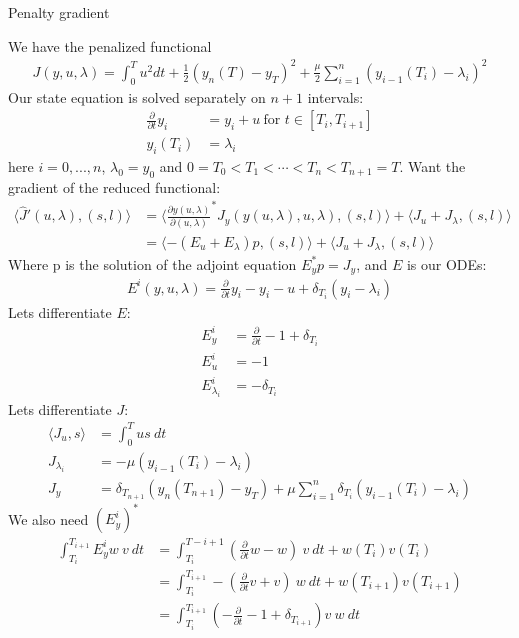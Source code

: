 \documentclass[11pt,a4paper]{report}
\begin{document}
\begin{center}

\LARGE Penalty gradient


\end{center}
We have the penalized functional
\begin{align*}
J(y,u,\lambda) = \int_0^T u^2 dt + \frac{1}{2}(y_n(T)-y_T)^2 + \frac{\mu}{2} \sum_{i=1}^n (y_{i-1}(T_i)-\lambda_i)^2 
\end{align*}
Our state equation is solved separately on $n+1$ intervals:
\begin{align*}
\frac{\partial }{\partial t} y_i &= y_i + u \ \text{for $t \in [T_{i},T_{i+1}]$}\\
y_i(T_i) &= \lambda_i
\end{align*}
here $i=0,...,n$, $\lambda_0=y_0$ and $0=T_0<T_1<\cdots<T_n<T_{n+1}=T$. Want the gradient of the reduced functional:
\begin{align*}
\langle \hat{J}'(u,\lambda), (s,l)\rangle &= \langle \frac{\partial y(u,\lambda)}{\partial(u,\lambda)}^* J_y(y(u,\lambda),u,\lambda), (s,l)\rangle + \langle J_u+J_{\lambda}, (s,l)\rangle \\
&=\langle -(E_u+E_{\lambda})p , (s,l)\rangle + \langle J_u+J_{\lambda}, (s,l)\rangle
\end{align*} 
Where p is the solution of the adjoint equation $E_y^*p=J_y$, and $E$ is our ODEs:
\begin{align*}
E^i(y,u,\lambda)= \frac{\partial }{\partial t} y_i - y_i -u+ \delta_{T_i}(y_i-\lambda_i)
\end{align*} 
Lets differentiate $E$:
\begin{align*}
E_y^i &= \frac{\partial }{\partial t} - 1 + \delta_{T_i} \\
E_u^i &= -1 \\
E_{\lambda_i}^i &= -\delta_{T_i}
\end{align*}
Lets differentiate $J$:
\begin{align*}
\langle J_u,s\rangle &= \int_0^T us \ dt \\
J_{\lambda_i}&= -\mu(y_{i-1}(T_i)-\lambda_i) \\
J_y &= \delta_{T_{n+1}}(y_n(T_{n+1})-y_T) + \mu \sum_{i=1}^n \delta_{T_{i}}(y_{i-1}(T_i)-\lambda_i ) 
\end{align*}
We also need $(E_y^i)^*$
\begin{align*}
\int_{T_i}^{T_{i+1}} E_y^iw \ v \ dt & = \int_{T_i}^{T-{i+1}} (\frac{\partial }{\partial t}w -w) \ v \ dt + w(T_i)v(T_i) \\
&= \int_{T_i}^{T_{i+1}}-(\frac{\partial }{\partial t}v+v) \ w \ dt + w(T_{i+1})v(T_{i+1}) \\
&= \int_{T_i}^{T_{i+1}} (-\frac{\partial }{\partial t}-1 + \delta_{T_{i+1}})v \ w \ dt
\end{align*} 
\end{document}
